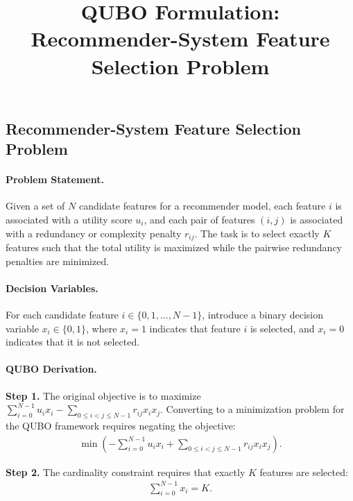 \documentclass[12pt]{article}
\title{QUBO Formulation: Recommender-System Feature Selection Problem}
\date{}
\begin{document}
\maketitle

\subsection*{Recommender-System Feature Selection Problem}

\paragraph{Problem Statement.}
Given a set of $N$ candidate features for a recommender model, each feature $i$ is associated with a utility score $u_i$, and each pair of features $(i,j)$ is associated with a redundancy or complexity penalty $r_{ij}$. The task is to select exactly $K$ features such that the total utility is maximized while the pairwise redundancy penalties are minimized.

\paragraph{Decision Variables.}
For each candidate feature $i \in \{0, 1, \dots, N-1\}$, introduce a binary decision variable $x_i \in \{0, 1\}$, where $x_i = 1$ indicates that feature $i$ is selected, and $x_i = 0$ indicates that it is not selected.

\paragraph{QUBO Derivation.}
\textbf{Step 1.} The original objective is to maximize $\sum_{i=0}^{N-1} u_i x_i - \sum_{0 \le i < j \le N-1} r_{ij} x_i x_j$. Converting to a minimization problem for the QUBO framework requires negating the objective:
\begin{align}
\min \left( -\sum_{i=0}^{N-1} u_i x_i + \sum_{0 \le i < j \le N-1} r_{ij} x_i x_j \right).
\end{align}

\textbf{Step 2.} The cardinality constraint requires that exactly $K$ features are selected:
\begin{align}
\sum_{i=0}^{N-1} x_i = K.
\end{align}
\end{document}

